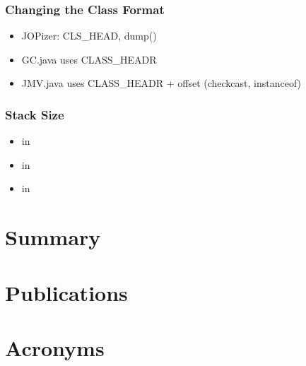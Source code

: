 \subsection{Changing the Class Format}

\begin{itemize}
    \item JOPizer: CLS\_HEAD, dump()
    \item GC.java uses CLASS\_HEADR
    \item JMV.java uses CLASS\_HEADR + offset (checkcast, instanceof)
\end{itemize}

\subsection{Stack Size}

\begin{itemize}
    \item {} in 
    \item {} in 
    \item {} in 
\end{itemize}

\chapter{Summary}
\label{chap:conclusions}

    





\appendix
 \ihead{\leftmark} %

\chapter{Publications}
    

\chapter{Acronyms}
 \label{appx:acro}



